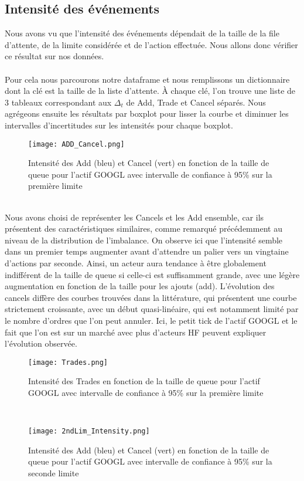 \documentclass[12pt,a4paper]{article}
\theoremstyle{definition}
\theoremstyle{remark}
\begin{document}
\subsection{Intensité des événements}
Nous avons vu que l'intensité des événements dépendait de la taille de la file d'attente, de la limite considérée et de 
l'action effectuée. Nous allons donc vérifier ce résultat sur nos données. 
\\
\\
Pour cela nous parcourons notre dataframe et nous remplissons un dictionnaire dont la clé est la taille de la liste d'attente. À chaque clé, l'on trouve une liste de 3 tableaux correspondant aux $\Delta_t$ de Add, Trade et Cancel séparés. Nous agrégeons ensuite les résultats par boxplot pour lisser la courbe et diminuer les intervalles d'incertitudes sur les intensités pour chaque boxplot.
\begin{figure}[h!]
    \centering
    \texttt{[image: ADD\_Cancel.png]}
    \caption{Intensité des Add (bleu) et Cancel (vert) en fonction de la taille de queue pour l'actif GOOGL avec intervalle de confiance à 95\% sur la première limite}
    \label{fig:add_cancel}
\end{figure}
\\
Nous avons choisi de représenter les Cancels et les Add ensemble, car ils présentent des caractéristiques similaires, comme remarqué précédemment au niveau de la distribution de l'imbalance. On observe ici que l’intensité semble dans un premier temps augmenter avant d'attendre un palier vers un vingtaine d'actions par seconde. Ainsi, un acteur aura tendance à être globalement indifférent de la taille de queue si celle-ci est suffisamment grande, avec une légère augmentation en fonction de la taille pour les ajouts (add). L'évolution des cancels diffère des courbes trouvées dans la littérature, qui présentent une courbe strictement croissante, avec un début quasi-linéaire, qui est notamment limité par le nombre d'ordres que l'on peut annuler. Ici, le petit tick de l'actif GOOGL et le fait que l'on est sur un marché avec plus d'acteurs HF peuvent expliquer l'évolution observée.
\begin{figure}[h!]
    \centering
    \texttt{[image: Trades.png]}
    \caption{Intensité des Trades en fonction de la taille de queue pour l'actif GOOGL avec intervalle de confiance à 95\% sur la première limite}
    \label{fig:trades}
\end{figure}
\\
\begin{figure}[h!]
    \centering
    \texttt{[image: 2ndLim\_Intensity.png]}
    \caption{Intensité des Add (bleu) et Cancel (vert) en fonction de la taille de queue pour l'actif GOOGL avec intervalle de confiance à 95\% sur la seconde limite}
    \label{fig:trades}
\end{figure}
\end{document}
